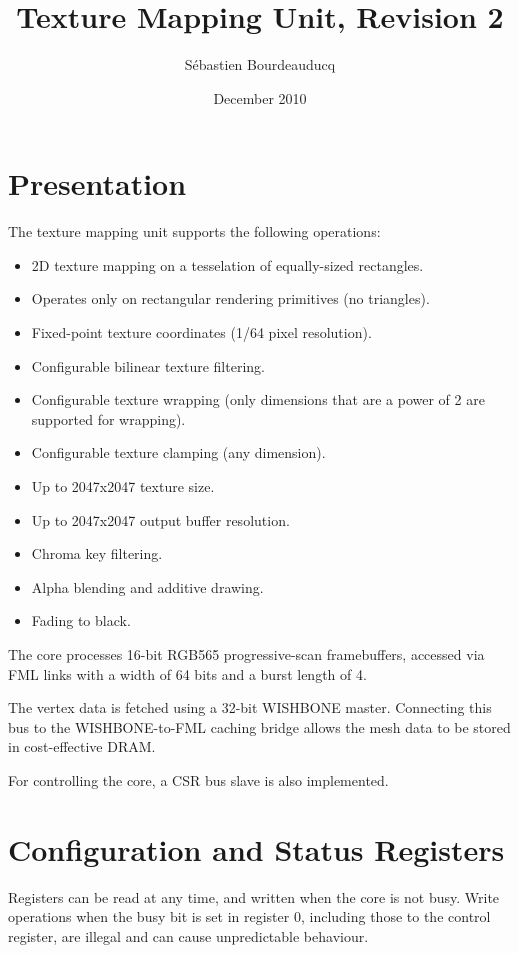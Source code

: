 \documentclass[a4paper,11pt]{article}
\title{Texture Mapping Unit, Revision 2}
\author{S\'ebastien Bourdeauducq}
\date{December 2010}
\begin{document}
\setlength{\parindent}{0pt}
\setlength{\parskip}{5pt}
\maketitle{}

\section{Presentation}
The texture mapping unit supports the following operations:
\begin{itemize}
\item 2D texture mapping on a tesselation of equally-sized rectangles.
\item Operates only on rectangular rendering primitives (no triangles).
\item Fixed-point texture coordinates (1/64 pixel resolution).
\item Configurable bilinear texture filtering.
\item Configurable texture wrapping (only dimensions that are a power of 2 are supported for wrapping).
\item Configurable texture clamping (any dimension).
\item Up to 2047x2047 texture size.
\item Up to 2047x2047 output buffer resolution.
\item Chroma key filtering.
\item Alpha blending and additive drawing.
\item Fading to black.
\end{itemize}

The core processes 16-bit RGB565 progressive-scan framebuffers, accessed via FML links with a width of 64 bits and a burst length of 4.

The vertex data is fetched using a 32-bit WISHBONE master. Connecting this bus to the WISHBONE-to-FML caching bridge allows the mesh data to be stored in cost-effective DRAM.

For controlling the core, a CSR bus slave is also implemented.

\section{Configuration and Status Registers}
Registers can be read at any time, and written when the core is not busy. Write operations when the busy bit is set in register 0, including those to the control register, are illegal and can cause unpredictable behaviour.
\end{document}
